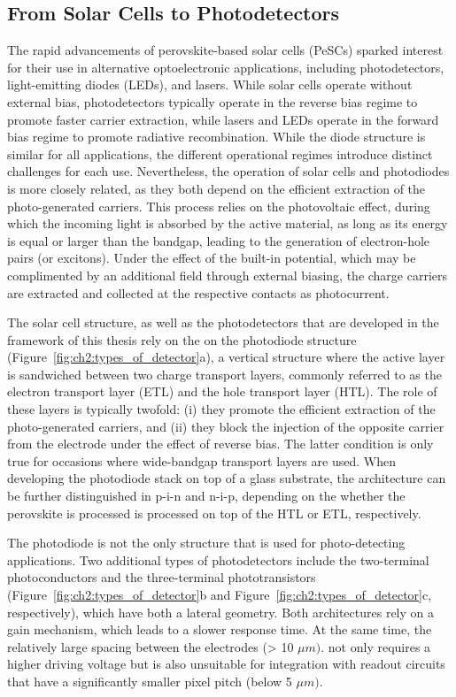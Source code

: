 \subsection{From Solar Cells to Photodetectors}

The rapid advancements of perovskite-based solar cells (PeSCs) sparked interest for their use in alternative optoelectronic applications, including photodetectors, light-emitting diodes (LEDs), and lasers. While solar cells operate without external bias, photodetectors typically operate in the reverse bias regime to promote faster carrier extraction, while lasers and LEDs operate in the forward bias regime to promote radiative recombination. While the diode structure is similar for all applications, the different operational regimes introduce distinct challenges for each use. Nevertheless, the operation of solar cells and photodiodes is more closely related, as they both depend on the efficient extraction of the photo-generated carriers. This process relies on the photovoltaic effect, during which the incoming light is absorbed by the active material, as long as its energy is equal or larger than the bandgap, leading to the generation of electron-hole pairs (or excitons). Under the effect of the built-in potential, which may be complimented by an additional field through external biasing, the charge carriers are extracted and collected at the respective contacts as photocurrent. 

The solar cell structure, as well as the photodetectors that are developed in the framework of this thesis rely on the on the photodiode structure (Figure~\ref{fig:ch2:types_of_detector}a), a vertical structure where the active layer is sandwiched between two charge transport layers, commonly referred to as the electron transport layer (ETL) and the hole transport layer (HTL). The role of these layers is typically twofold: (i) they promote the efficient extraction of the photo-generated carriers, and (ii) they block the injection of the opposite carrier from the electrode under the effect of reverse bias. The latter condition is only true for occasions where wide-bandgap transport layers are used. When developing the photodiode stack on top of a glass substrate, the architecture can be further distinguished in p-i-n and n-i-p, depending on the whether the perovskite is processed is processed on top of the HTL or ETL, respectively. 

The photodiode is not the only structure that is used for photo-detecting applications. Two additional types of photodetectors include the two-terminal photoconductors and the three-terminal phototransistors (Figure~\ref{fig:ch2:types_of_detector}b and Figure~\ref{fig:ch2:types_of_detector}c, respectively), which have both a lateral geometry. Both architectures rely on a gain mechanism, which leads to a slower response time. At the same time, the relatively large spacing between the electrodes (> 10 $\mu m)$. not only requires a higher driving voltage but is also unsuitable for integration with readout circuits that have a significantly smaller pixel pitch (below 5 $\mu m)$.

